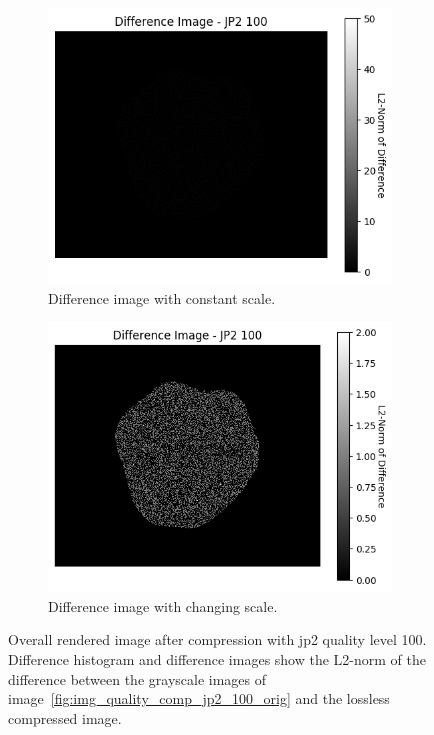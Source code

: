 \begin{figure}[htb]
\begin{subfigure}[b]{0.48\textwidth}
        \label{fig:img_quality_comp_jp2_100_histo}
    \end{subfigure}
    \\
    \begin{subfigure}[b]{0.48\textwidth}
        \centering
        \includegraphics[width=\textwidth]{doc/thesis/0_figures/compare_quality/set1/jp2_100_diff_heatmap.png}
        \caption{Difference image with constant scale.}
        \label{fig:img_quality_comp_jp2_100_diff}
    \end{subfigure}
    \begin{subfigure}[b]{0.48\textwidth}
        \centering
        \includegraphics[width=\textwidth]{doc/thesis/0_figures/compare_quality/set1/jp2_100_diff_heatmap_rel.png}
        \caption{Difference image with changing scale.}
        \label{fig:img_quality_comp_jp2_100_diff_rel}
    \end{subfigure}
    \caption{Overall rendered image after compression with \gls{jp2} quality level 100. Difference histogram and difference images show the L2-norm of the difference between the grayscale images of image~\ref{fig:img_quality_comp_jp2_100_orig} and the lossless compressed image.}
    \label{fig:img_quality_comp_jp2_100}
\end{figure}

